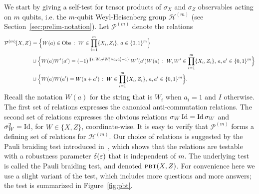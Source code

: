 We start by giving a self-test for tensor products of $\sigma_X$ and $\sigma_Z$ 
observables acting on $m$ qubits, i.e. the $m$-qubit Weyl-Heisenberg group $\mathcal{H}^{(m)}$ (see Section~\ref{sec:prelim-notation}). 
Let $\mathcal{P}^{(m)}$ denote the relations  
\begin{align*}
\mathcal{P}^{(m)}\!\{X,Z\} &= \Big\{ W(a)\in\mathrm{Obs}\,: \;W \in \prod_{i=1}^m \{X_i,Z_i\},\,a\in\{0,1\}^m\Big\}\\
&\cup \Big\{W(a)W'(a')=(-1)^{|\{i:\,W_i\neq W'_i \wedge a_ia'_i=1\}|} W'(a')W(a)\,:\;W,W' \in \prod_{i=1}^m \{X_i,Z_i\},\, a,a'\in\{0,1\}^m\Big\}\\
& \cup\Big\{ W(a)W(a')=W(a+a')\,:\;W \in \prod_{i=1}^m \{X_i,Z_i\},\, a,a'\in\{0,1\}^m\Big\}.
\end{align*}
Recall the notation $W(a)$ for the string that is $W_i$ when $a_i=1$ and $I$ otherwise. 
The first set of relations expresses the canonical anti-commutation relations. The second set of relations expresses the obvious relations $\sigma_W \mathop{\rm Id}\nolimits = \mathop{\rm Id}\nolimits \sigma_W$ and $\sigma_W^2 = \mathop{\rm Id}\nolimits$, for $W\in\{X,Z\}$, coordinate-wise. It is easy to verify that $\mathcal{P}^{(m)}$ forms a defining set of relations for $\mathcal{H}^{(m)}$. Our choice of relations is suggested by the Pauli braiding test introduced in~\cite{natarajan2016robust}, which shows that the relations are testable with a robustness parameter $\delta(\varepsilon)$ that is independent of $m$. 
The underlying test is called the Pauli braiding test, and denoted $\textsc{pbt}(X,Z)$. For convenience here we use a slight variant of the test, which includes more questions and more answers; the test is summarized in Figure~\ref{fig:pbt}. 


